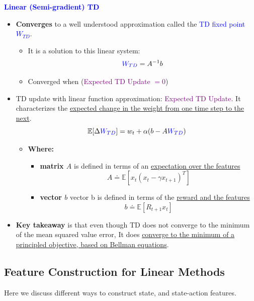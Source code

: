 \documentclass[12pt, a4paper]{article}
\begin{document}
\textbf{\textcolor{blue}{Linear (Semi-gradient) TD}}
\begin{itemize}
  \item \textbf{Converges} to a well understood approximation called the \textcolor{blue}{TD fixed point $W_{TD}$}.
  \begin{itemize}
    \item It is a solution to this linear system:
    $$
    \textcolor{blue}{W_{TD}} = A^{-1} b
    $$
    \item Converged when (\textcolor{purple}{Expected TD Update $= 0$})
  \end{itemize}
  \item TD update with linear function approximation: \textcolor{purple}{Expected TD Update}. It characterizes the \uline{expected change in the weight from one time step to the next}.
  $$
  \mathbb{E}[ \Delta \textcolor{blue}{W_{TD}}] = w_t + \alpha (b - A \textcolor{blue}{W_{TD}})
  $$
  \begin{itemize}
    \item \textbf{Where:}
    \begin{itemize}
      \item \textbf{matrix $A$} is defined in terms of an \uline{expectation over the features}
      $$
      A \doteq \mathbb{E}[x_t (x_t - \gamma x_{t+1})^T]
      $$
      \item \textbf{vector $b$} vector b is defined in terms of the \uline{reward and the features}
      $$
      b \doteq \mathbb{E}[R_{t+1} x_t]
      $$
    \end{itemize}
  \end{itemize}
  \item \textbf{Key takeaway} is that even though TD does not converge to the minimum of the mean squared value error, It does \uline{converge to the minimum of a principled objective, based on Bellman equations}.
\end{itemize}












\subsection{Feature Construction for Linear Methods}\label{feature-construction-for-linear-methods}

Here we discuss different ways to construct state, and state-action features.
\end{document}
